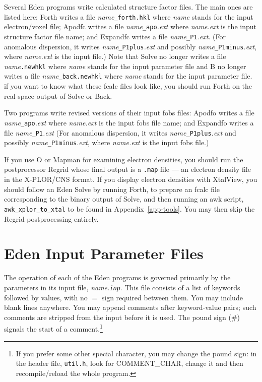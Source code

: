 \documentclass{report}
\begin{document}
\vspace {0.1in}

Several Eden programs write calculated structure factor files.  
The main ones are listed here:
Forth writes a file {\it name}{\tt \_forth.hkl}
where {\it name} stands for the input electron/voxel file; 
Apodfc writes a file {\it name}{\tt \_apo}{\it .ext}
where {\it name.ext} is the input structure factor file name; and
Expandfc writes a file {\it name}{\tt \_P1}{\it .ext}.
(For anomalous dispersion, it writes {\it name}{\tt \_P1plus}{\it .ext} 
and possibly
{\it name}{\tt \_P1minus}{\it .ext}, where {\it name.ext} is the input file.)
Note that Solve no longer writes a file {\it name}{\tt .newhkl}
where {\it name} stands for the input parameter file
and B no longer writes a file {\it name}{\tt \_back.newhkl}
where {\it name} stands for the input parameter file. 
if you want to know what these fcalc files look like, 
you should run Forth  
on the real-space output of Solve or Back.

Two programs write revised versions of their input fobs files:
Apodfo writes a file {\it name}{\tt \_apo}{\it .ext}
where {\it name.ext} is the input fobs file name; and
Expandfo writes a file {\it name}{\tt \_P1}{\it .ext} 
(For anomalous dispersion, it writes {\it name}{\tt \_P1plus}{\it .ext} and 
possibly {\it name}{\tt \_P1minus}{\it .ext},
where {\it name.ext} is the input fobs file.)

\vspace {0.1in}

If you use O or Mapman for examining electron densities, 
you should run the postprocessor Regrid whose final output is 
a {\tt .map} file --- an electron density file in the 
X-PLOR/CNS format. 
If you display electron densities with XtalView,
you should follow an Eden Solve by running 
Forth, to prepare an fcalc
file corresponding to the binary output of Solve, and then
running an awk script,
{\tt awk\_xplor\_to\_xtal} to be found in Appendix~\ref{app-tools}.
You may then skip the Regrid postprocessing entirely.

\section {Eden Input Parameter Files}
\label{files-eden}

The operation of each of the Eden programs is governed primarily by the
parameters in its input file, {\it{name}.\tt{inp}}.  This file consists
of a list of keywords followed by values, with no $=$ sign 
required between them.  You may include blank lines anywhere.
You may append comments after keyword-value pairs; 
such comments are stripped from the
input before it is used.  The pound sign (\#) signals the
start of a comment.\footnote{If you prefer some other special character,
you may change the pound sign: in the header file, {\tt util.h}, look for
COMMENT\_CHAR, change it and then recompile/reload the whole program.}
\end{document}
